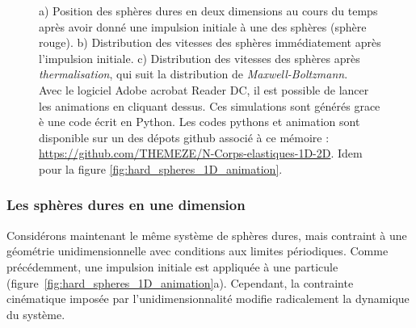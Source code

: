 \begin{figure}[h]
\begin{tikzpicture}

    \end{tikzpicture}
    \caption{a) Position des sphères dures en deux dimensions au cours du temps après avoir donné une impulsion initiale à une des sphères (sphère rouge). b) Distribution des vitesses des sphères immédiatement après l'impulsion initiale. c) Distribution des vitesses des sphères après \emph{thermalisation}, qui suit la distribution de \emph{Maxwell-Boltzmann}.\\
        Avec le logiciel Adobe acrobat Reader DC, il est possible de lancer les animations en cliquant dessus. Ces simulations sont générés grace è une code écrit en Python.
        Les codes pythons et animation sont disponible sur un des dépots github associé à ce mémoire : \url{https://github.com/THEMEZE/N-Corps-elastiques-1D-2D}. Idem pour la figure \ref{fig:hard_spheres_1D_animation}.
    }
    \label{fig:hard_spheres_2D_animation}
\end{figure}

\vspace{-0.5cm}
\subsubsection{Les sphères dures en une dimension}

Considérons maintenant le même système de sphères dures, mais contraint à une
géométrie unidimensionnelle avec conditions aux limites périodiques. Comme
précédemment, une impulsion initiale est appliquée à une particule
(figure~\ref{fig:hard_spheres_1D_animation}a). Cependant, la contrainte
cinématique imposée par l’unidimensionnalité modifie radicalement la dynamique
du système.

\smallskip


